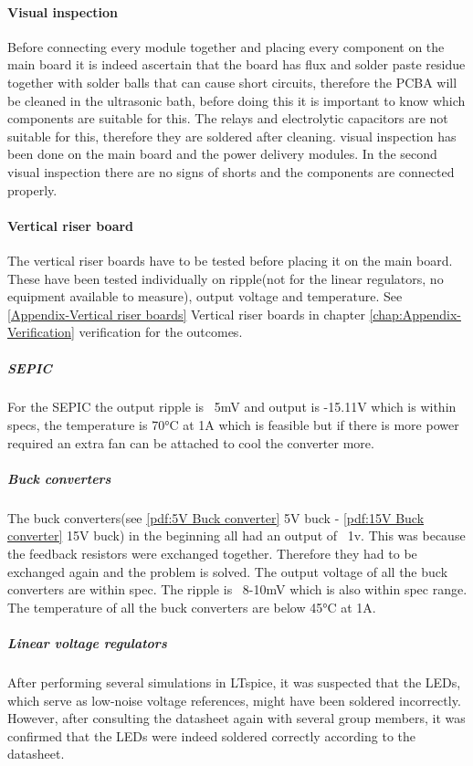 \paragraph{Visual inspection} 

Before connecting every module together and placing every component on the main board it is indeed ascertain that the board has flux and solder paste residue together with solder balls that can cause short circuits, therefore the PCBA will be cleaned in the ultrasonic bath, before doing this it is important to know which components are suitable for this. The relays and electrolytic capacitors are not suitable for this, therefore they are soldered after cleaning.  visual inspection has been done on the main board and the power delivery modules. In the second visual inspection there are no signs of shorts and the components are connected properly.

\paragraph{Vertical riser board}
The vertical riser boards have to be tested before placing it on the main board. These have been tested individually on ripple(not for the linear regulators, no equipment available to measure), output voltage and temperature. See \ref{Appendix-Vertical riser boards} Vertical riser boards in chapter \ref{chap:Appendix-Verification} verification for the outcomes.  \subparagraph{SEPIC} For the SEPIC the output ripple is ~5mV and output is -15.11V which is within specs, the temperature is 70°C at 1A which is feasible but if there is more power required an extra fan can be attached to cool the converter more. 
\subparagraph{Buck converters} The buck converters(see \ref{pdf:5V Buck converter} 5V buck - \ref{pdf:15V Buck converter} 15V buck) in the beginning all had an output of ~1v. This was because the feedback resistors were exchanged together. Therefore they had to be exchanged again and the problem is solved. The output voltage of all the buck converters are within spec. The ripple is ~8-10mV which is also within spec range. The temperature of all the buck converters are below 45°C at 1A. 
\subparagraph{Linear voltage regulators} After performing several simulations in LTspice, it was suspected that the LEDs, which serve as low-noise voltage references, might have been soldered incorrectly. However, after consulting the datasheet again with several group members, it was confirmed that the LEDs were indeed soldered correctly according to the datasheet.

